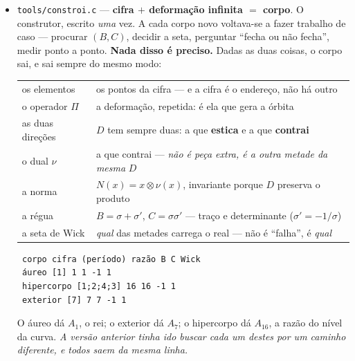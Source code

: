 \documentclass[11pt]{article}
\newcommand{\code}[1]{\texttt{\small #1}}
\theoremstyle{plain}
\theoremstyle{remark}
\begin{document}
\begin{itemize}
O conjunto dos prefixos continua a valer --- mas não porque a cifra seja sem posição: porque
\emph{o conjunto dos prefixos é o conjunto das coordenadas já fixadas}, e a interseção é o maior
prefixo de coordenadas em comum. As duas leituras são a mesma.

\textbf{E não foi preciso codificar nada de novo: a árvore já era esse conjunto.} O caminho de um
texto é o conjunto dos seus nós, e o caminho partilhado é a interseção --- estava construída desde
o início do dia e lia-se-a como passeio em vez de como conjunto.

\item \code{tools/constroi.c} --- \textbf{cifra $+$ deformação infinita $=$ corpo}. O construtor,
escrito \emph{uma} vez. A cada corpo novo voltava-se a fazer trabalho de caso --- procurar $(B,C)$,
decidir a seta, perguntar ``fecha ou não fecha'', medir ponto a ponto. \textbf{Nada disso é
preciso.} Dadas as duas coisas, o corpo sai, e sai sempre do mesmo modo:

\begin{center}\begin{tabular}{@{}ll@{}}
os elementos & os pontos da cifra --- e a cifra é o endereço, não há outro\\
o operador $\Pi$ & a deformação, repetida: é ela que gera a órbita\\
as duas direções & $D$ tem sempre duas: a que \textbf{estica} e a que \textbf{contrai}\\
o dual $\nu$ & a que contrai --- \emph{não é peça extra, é a outra metade da mesma} $D$\\
a norma & $N(x) = x \otimes \nu(x)$, invariante porque $D$ preserva o produto\\
a régua & $B = \sigma + \sigma'$, $C = \sigma\sigma'$ --- traço e determinante ($\sigma'=-1/\sigma$)\\
a seta de Wick & \emph{qual} das metades carrega o real --- não é ``falha'', é \emph{qual}\\
\end{tabular}\end{center}

\begin{verbatim}
 corpo cifra (período) razão B C Wick
 áureo [1] 1 1 -1 1
 hipercorpo [1;2;4;3] 16 16 -1 1
 exterior [7] 7 7 -1 1
\end{verbatim}

O áureo dá $A_1$, o rei; o exterior dá $A_7$; o hipercorpo dá $A_{16}$, a razão do nível da curva.
\emph{A versão anterior tinha ido buscar cada um destes por um caminho diferente, e todos saem da mesma linha.}


\end{itemize}
\end{document}
